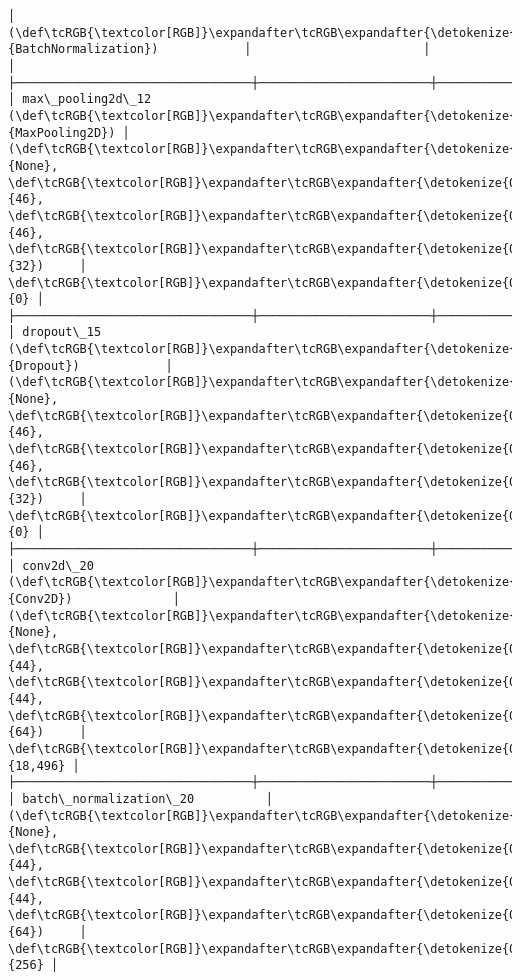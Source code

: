 \documentclass[11pt]{article}
\begin{document}
\begin{Verbatim}[commandchars=\\\{\}]
│ (\def\tcRGB{\textcolor[RGB]}\expandafter\tcRGB\expandafter{\detokenize{0,135,255}}{BatchNormalization})            │                        │               │
├─────────────────────────────────┼────────────────────────┼───────────────┤
│ max\_pooling2d\_12 (\def\tcRGB{\textcolor[RGB]}\expandafter\tcRGB\expandafter{\detokenize{0,135,255}}{MaxPooling2D}) │ (\def\tcRGB{\textcolor[RGB]}\expandafter\tcRGB\expandafter{\detokenize{0,215,255}}{None}, \def\tcRGB{\textcolor[RGB]}\expandafter\tcRGB\expandafter{\detokenize{0,175,0}}{46}, \def\tcRGB{\textcolor[RGB]}\expandafter\tcRGB\expandafter{\detokenize{0,175,0}}{46}, \def\tcRGB{\textcolor[RGB]}\expandafter\tcRGB\expandafter{\detokenize{0,175,0}}{32})     │             \def\tcRGB{\textcolor[RGB]}\expandafter\tcRGB\expandafter{\detokenize{0,175,0}}{0} │
├─────────────────────────────────┼────────────────────────┼───────────────┤
│ dropout\_15 (\def\tcRGB{\textcolor[RGB]}\expandafter\tcRGB\expandafter{\detokenize{0,135,255}}{Dropout})            │ (\def\tcRGB{\textcolor[RGB]}\expandafter\tcRGB\expandafter{\detokenize{0,215,255}}{None}, \def\tcRGB{\textcolor[RGB]}\expandafter\tcRGB\expandafter{\detokenize{0,175,0}}{46}, \def\tcRGB{\textcolor[RGB]}\expandafter\tcRGB\expandafter{\detokenize{0,175,0}}{46}, \def\tcRGB{\textcolor[RGB]}\expandafter\tcRGB\expandafter{\detokenize{0,175,0}}{32})     │             \def\tcRGB{\textcolor[RGB]}\expandafter\tcRGB\expandafter{\detokenize{0,175,0}}{0} │
├─────────────────────────────────┼────────────────────────┼───────────────┤
│ conv2d\_20 (\def\tcRGB{\textcolor[RGB]}\expandafter\tcRGB\expandafter{\detokenize{0,135,255}}{Conv2D})              │ (\def\tcRGB{\textcolor[RGB]}\expandafter\tcRGB\expandafter{\detokenize{0,215,255}}{None}, \def\tcRGB{\textcolor[RGB]}\expandafter\tcRGB\expandafter{\detokenize{0,175,0}}{44}, \def\tcRGB{\textcolor[RGB]}\expandafter\tcRGB\expandafter{\detokenize{0,175,0}}{44}, \def\tcRGB{\textcolor[RGB]}\expandafter\tcRGB\expandafter{\detokenize{0,175,0}}{64})     │        \def\tcRGB{\textcolor[RGB]}\expandafter\tcRGB\expandafter{\detokenize{0,175,0}}{18,496} │
├─────────────────────────────────┼────────────────────────┼───────────────┤
│ batch\_normalization\_20          │ (\def\tcRGB{\textcolor[RGB]}\expandafter\tcRGB\expandafter{\detokenize{0,215,255}}{None}, \def\tcRGB{\textcolor[RGB]}\expandafter\tcRGB\expandafter{\detokenize{0,175,0}}{44}, \def\tcRGB{\textcolor[RGB]}\expandafter\tcRGB\expandafter{\detokenize{0,175,0}}{44}, \def\tcRGB{\textcolor[RGB]}\expandafter\tcRGB\expandafter{\detokenize{0,175,0}}{64})     │           \def\tcRGB{\textcolor[RGB]}\expandafter\tcRGB\expandafter{\detokenize{0,175,0}}{256} │

\end{Verbatim}
\end{document}
